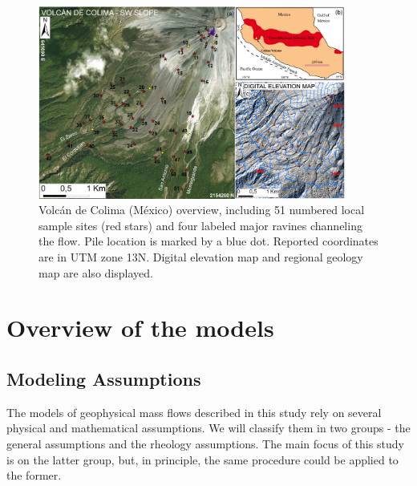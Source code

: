 \documentclass{article}
\begin{document}
\begin{figure}[H]
    \includegraphics[width=0.9\textwidth]{BAF_VolcanDeColima/ColimaFig.jpg}
    \centering
    \caption{Volc{\'a}n de Colima (M{\'e}xico) overview, including 51 numbered local sample sites (red stars) and four labeled major ravines channeling the flow. Pile location is marked by a blue dot. Reported coordinates are in UTM zone 13N. Digital elevation map and regional geology map are also displayed.}
    \label{fig:Colima-first}
\end{figure}

\section{Overview of the models}\label{sec:GeoPhFlows}

\subsection{Modeling Assumptions}\label{subsec:ModelAssump}
The models of geophysical mass flows described in this study rely on several physical and mathematical assumptions. We will classify them in two groups - the general assumptions and the rheology assumptions. The main focus of this study is on the latter group, but, in principle, the same procedure could be applied to the former.
\end{document}
